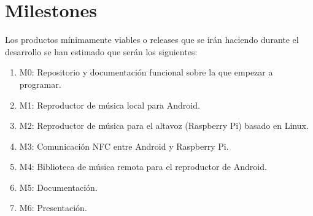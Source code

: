 \section{Milestones}
Los productos mínimamente viables o releases que se irán haciendo durante el
desarrollo se han estimado que serán los siguientes:

\begin{enumerate}
    \item M0: Repositorio y documentación funcional sobre la que empezar a programar.
    \item M1: Reproductor de música local para Android.
    \item M2: Reproductor de música para el altavoz (Raspberry Pi) basado en Linux.
    \item M3: Comunicación NFC entre Android y Raspberry Pi.
    \item M4: Biblioteca de música remota para el reproductor de Android.
    \item M5: Documentación.
    \item M6: Presentación.
\end{enumerate}